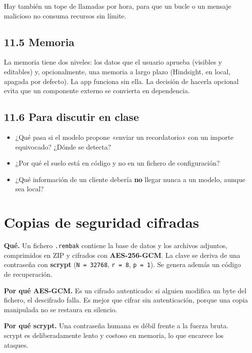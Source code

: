 Hay también un tope de llamadas por hora, para que un bucle o un mensaje malicioso no consuma recursos sin límite.

\section{11.5 Memoria}\label{memoria}

La memoria tiene dos niveles: los datos que el usuario aprueba (visibles y editables) y, opcionalmente, una memoria a largo plazo (Hindsight, en local, apagada por defecto). La app funciona sin ella. La decisión de hacerla opcional evita que un componente externo se convierta en dependencia.

\section{11.6 Para discutir en clase}\label{para-discutir-en-clase}

\begin{itemize}
\tightlist
\item
  ¿Qué pasa si el modelo propone «enviar un recordatorio» con un importe equivocado? ¿Dónde se detecta?
\item
  ¿Por qué el suelo está en código y no en un fichero de configuración?
\item
  ¿Qué información de un cliente debería \textbf{no} llegar nunca a un modelo, aunque sea local?
\end{itemize}

\chapter{Copias de seguridad cifradas}\label{copias-de-seguridad-cifradas}

\textbf{Qué.} Un fichero \texttt{.rembak} contiene la base de datos y los archivos adjuntos, comprimidos en ZIP y cifrados con \textbf{AES-256-GCM}. La clave se deriva de una contraseña con \textbf{scrypt} (\texttt{N\ =\ 32768}, \texttt{r\ =\ 8}, \texttt{p\ =\ 1}). Se genera además un código de recuperación.

\textbf{Por qué AES-GCM.} Es un cifrado autenticado: si alguien modifica un byte del fichero, el descifrado falla. Es mejor que cifrar sin autenticación, porque una copia manipulada no se restaura en silencio.

\textbf{Por qué scrypt.} Una contraseña humana es débil frente a la fuerza bruta. scrypt es deliberadamente lento y costoso en memoria, lo que encarece los ataques.

